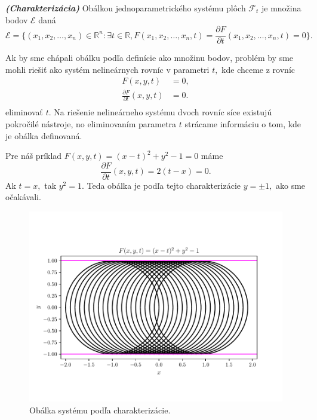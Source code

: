 \begin{definition}\textit{\textbf{(Charakterizácia)}}
Obálkou jednoparametrického systému plôch $ \mathcal{F}_{t} $ je množina bodov $\mathcal{E}$ daná
$$\mathcal{E} = \{(x_{1}, x_{2}, \dots, x_{n})  \in \mathbb{R}^{n} \colon \exists t \in \mathbb{R}, F(x_{1}, x_{2}, \dots, x_{n}, t) = \frac{\partial F}{\partial t}(x_{1}, x_{2}, \dots, x_{n}, t) = 0 \}.$$
\end{definition}

Ak by sme chápali obálku podľa definície ako množinu bodov, problém by sme mohli riešiť ako systém nelineárnych rovníc v parametri $t,$ kde chceme z rovníc 
\begin{align*}
F(x,y,t) &= 0, \\
\frac{\partial F}{\partial t}(x, y, t) &= 0. \\
\end{align*}
eliminovať $t.$ Na riešenie nelineárneho systému dvoch rovníc síce existujú pokročilé nástroje, no eliminovaním parametra $t$ strácame informáciu o tom, kde je obálka definovaná. 

\begin{example}
Pre náš príklad $ F(x, y, t) = (x - t)^2 + y^2 - 1 = 0 $ máme 
$$\frac{\partial F}{\partial t}(x, y, t) = 2(t-x) = 0. $$
Ak $t = x, $ tak $y^2 = 1.$ Teda obálka je podľa tejto charakterizácie $ y = \pm 1, $ ako sme očakávali.
\end{example}

\begin{figure}[H]
	\centering
	\includegraphics{images/system_with_envelope_unlimited_domain.pdf}
	\caption{Obálka systému podľa charakterizácie.}
	\label{fig:system_with_envelope_unlimited_domain}
\end{figure}

